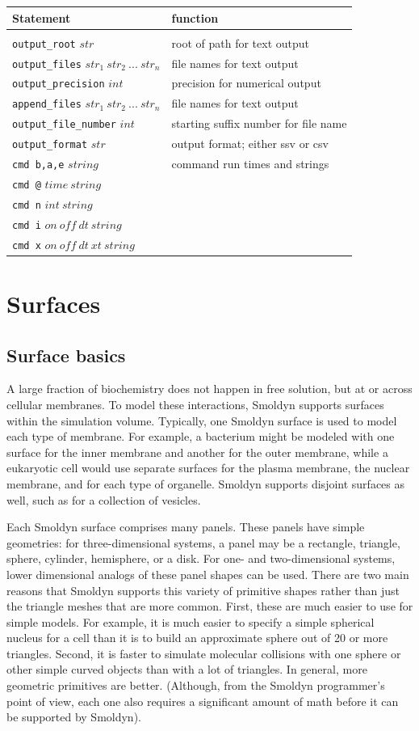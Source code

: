 \documentclass {book}
\newcommand {\ttt} {\texttt}
\begin{document}
\begin{longtable}[c]{ll}
Statement & function\\
\hline\\
\ttt{output\_root} $str$ & root of path for text output\\
\ttt{output\_files} $str_1\ str_2\ ...\ str_n$ & file names for text output\\
\ttt{output\_precision} $int$ & precision for numerical output\\
\ttt{append\_files} $str_1\ str_2\ ...\ str_n$ & file names for text output\\
\ttt{output\_file\_number} $int$ & starting suffix number for file name\\
\ttt{output\_format} $str$ & output format; either ssv or csv\\
\ttt{cmd b,a,e} $string$ & command run times and strings\\
\ttt{cmd @} $time\ string$\\
\ttt{cmd n} $int\ string$\\
\ttt{cmd i} $on\ off\ dt\ string$\\
\ttt{cmd x} $on\ off\ dt\ xt\ string$
\end{longtable}


\chapter{Surfaces}

\section{Surface basics}

A large fraction of biochemistry does not happen in free solution, but at or across cellular membranes. To model these interactions, Smoldyn supports surfaces within the simulation volume. Typically, one Smoldyn surface is used to model each type of membrane. For example, a bacterium might be modeled with one surface for the inner membrane and another for the outer membrane, while a eukaryotic cell would use separate surfaces for the plasma membrane, the nuclear membrane, and for each type of organelle. Smoldyn supports disjoint surfaces as well, such as for a collection of vesicles.

Each Smoldyn surface comprises many panels. These panels have simple geometries: for three-dimensional systems, a panel may be a rectangle, triangle, sphere, cylinder, hemisphere, or a disk. For one- and two-dimensional systems, lower dimensional analogs of these panel shapes can be used. There are two main reasons that Smoldyn supports this variety of primitive shapes rather than just the triangle meshes that are more common. First, these are much easier to use for simple models. For example, it is much easier to specify a simple spherical nucleus for a cell than it is to build an approximate sphere out of 20 or more triangles. Second, it is faster to simulate molecular collisions with one sphere or other simple curved objects than with a lot of triangles. In general, more geometric primitives are better. (Although, from the Smoldyn programmer's point of view, each one also requires a significant amount of math before it can be supported by Smoldyn).
\end{document}
